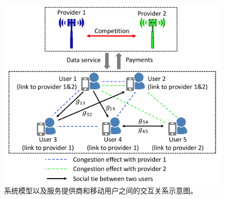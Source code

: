 \begin{figure}[htb]
\centering
\includegraphics[scale=0.56]{./pic/scheme0.pdf}
\vspace{-0.0cm}
\caption{系统模型以及服务提供商和移动用户之间的交互关系示意图。}\label{fg:scheme}
\end{figure}


